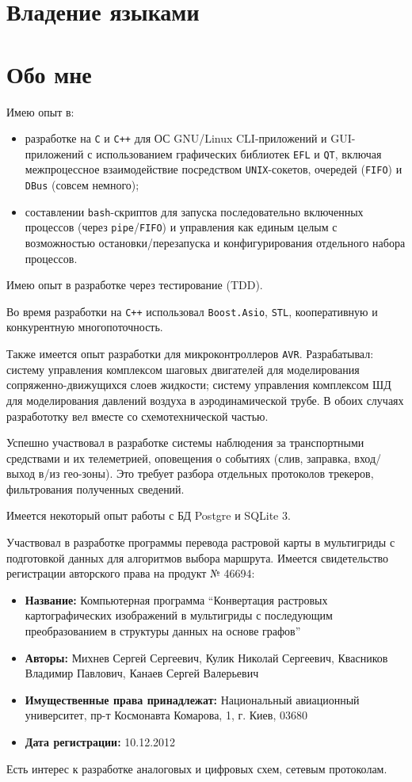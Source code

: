 \documentclass[11pt,a4paper,russian]{moderncv}
\begin{document}
\section{Владение языками}

\section{Обо мне}
\par{Имею опыт в:}
\begin{itemize}
\item разработке на \texttt{C} и \texttt{C++} для ОС GNU/Linux CLI-приложений и GUI-приложений с использованием графических библиотек \texttt{EFL} и \texttt{QT}, включая межпроцессное взаимодействие посредством \texttt{UNIX}-сокетов, очередей (\texttt{FIFO}) и \texttt{DBus} (совсем немного);
\item составлении \texttt{bash}-скриптов для запуска последовательно включенных процессов (через \texttt{pipe}/\texttt{FIFO}) и управления как единым целым с возможностью остановки/перезапуска и конфигурирования отдельного набора процессов.
\end{itemize}
\par{Имею опыт в разработке через тестирование (TDD).}
\par{Во время разработки на \texttt{C++} использовал \texttt{Boost.Asio}, \texttt{STL}, кооперативную и конкурентную многопоточность.}
\par{Также имеется опыт разработки для микроконтроллеров \texttt{AVR}. Разрабатывал: систему управления комплексом шаговых двигателей для моделирования сопряженно-движущихся слоев жидкости; систему управления комплексом ШД для моделирования давлений воздуха в аэродинамической трубе. В обоих случаях разработотку вел вместе со схемотехнической частью.}
\par{Успешно участвовал в разработке системы наблюдения за транспортными средствами и их телеметрией, оповещения о событиях (слив, заправка, вход/выход в/из гео-зоны). Это требует разбора отдельных протоколов трекеров, фильтрования полученных сведений.}
\par{Имеется некоторый опыт работы с БД Postgre и SQLite 3.}
\par{Участвовал в разработке программы перевода растровой карты в мультигриды с подготовкой данных для алгоритмов выбора маршрута. Имеется свидетельство регистрации авторского права на продукт № 46694:}
\begin{itemize}
\item \textbf{Название:} Компьютерная программа ``Конвертация растровых картографических изображений в мультигриды с последующим преобразованием в структуры данных на основе графов''
\item \textbf{Авторы:} Михнев Сергей Сергеевич, Кулик Николай Сергеевич, Квасников Владимир Павлович, Канаев Сергей Валерьевич
\item \textbf{Имущественные права принадлежат:} Национальный авиационный университет, пр-т Космонавта Комарова, 1, г. Киев, 03680
\item \textbf{Дата регистрации:} 10.12.2012
\end{itemize}
\par{Есть интерес к разработке аналоговых и цифровых схем, сетевым протоколам.}

\clearpage
\end{document}
